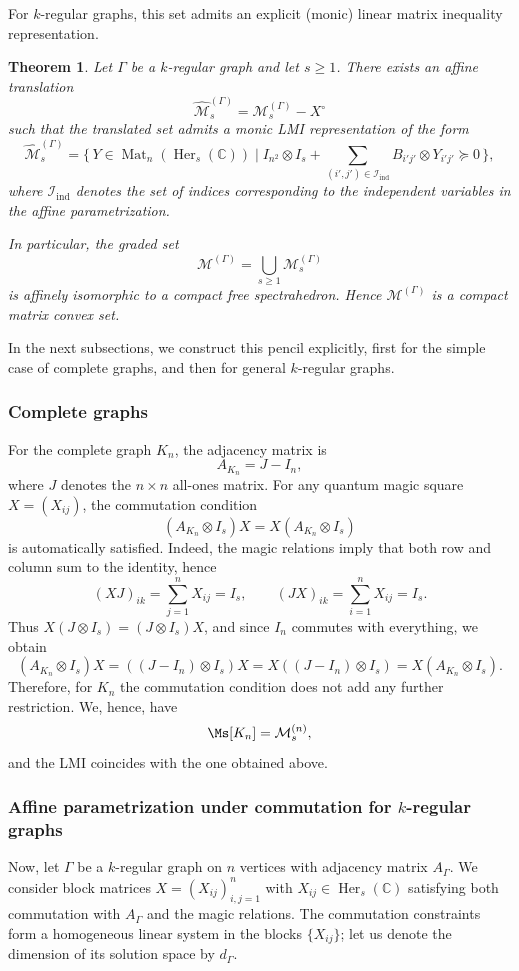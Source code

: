 \documentclass[11pt, a4paper]{article}
\theoremstyle{plain}
\newtheorem{theorem}{Theorem}[section]
\theoremstyle{definition}
\theoremstyle{remark}
\newcommand{\C}{\mathbb{C}}
\newcommand{\cMn}{\mathcal{M}^{(n)}}
\newcommand{\Her}[2][\C]{\operatorname{Her}_{#2}(#1)}
\begin{document}
For \(k\)-regular graphs, this set admits an explicit (monic) linear matrix inequality representation.
\begin{theorem}\label{thm:kregular_GQMS_freespec}
Let \(\Gamma\) be a \(k\)-regular graph and let \(s \ge 1\).
There exists an affine translation
\[
\widehat{\mathcal M}^{(\Gamma)}_s
=
\mathcal M^{(\Gamma)}_s - X^\circ
\]
such that the translated set admits a monic LMI representation of the form
\[
\widehat{\mathcal M}^{(\Gamma)}_s
=
\bigl\{\, Y \in \operatorname{Mat}_n(\Her{s}) \mid
I_{n^2}\otimes I_s
+ \sum_{(i',j')\in \mathcal{I}_{\mathrm{ind}}}
B_{i'j'} \otimes Y_{i'j'}
\succeq 0
\,\bigr\},
\]
where \(\mathcal{I}_{\mathrm{ind}}\) denotes the set of indices corresponding to the
independent variables in the affine parametrization.

In particular, the graded set
\[
\mathcal M^{(\Gamma)} = \bigcup_{s \ge 1} \mathcal M^{(\Gamma)}_s
\]
is affinely isomorphic to a compact free spectrahedron.
Hence \(\mathcal M^{(\Gamma)}\) is a compact matrix convex set.
\end{theorem}


In the next subsections, we construct this pencil explicitly, first for the simple case of complete graphs, and then for general \(k\)-regular graphs.


\subsubsection{Complete graphs}

For the complete graph \(K_n\), the adjacency matrix is
\[
A_{K_n} = J - I_n,
\]
where \(J\) denotes the \(n\times n\) all-ones matrix.
For any quantum magic square \(X=(X_{ij})\), the commutation condition
\[
(A_{K_n}\otimes I_s) X = X (A_{K_n}\otimes I_s)
\]
is automatically satisfied. Indeed, the magic relations imply that both row and column sum to the identity, hence
\[
(XJ)_{ik} = \sum_{j=1}^n X_{ij} = I_s, \qquad
(JX)_{ik} = \sum_{i=1}^n X_{ij} = I_s.
\]
Thus \(X(J\otimes I_s) = (J\otimes I_s)X\), and since \(I_n\) commutes with everything, we obtain
\[
(A_{K_n}\otimes I_s)X = ((J-I_n)\otimes I_s)X = X((J-I_n)\otimes I_s) = X (A_{K_n}\otimes I_s).
\]
Therefore, for \(K_n\) the commutation condition does not add any further restriction. We, hence, have
\[
\Ms[K_n] = \cMn_s,
\]
and the LMI coincides with the one obtained above.
\subsubsection{Affine parametrization under commutation for \(k\)-regular graphs}
Now, let \(\Gamma\) be a \(k\)-regular graph on \(n\) vertices with adjacency matrix \(A_\Gamma\). 
We consider block matrices \(X = (X_{ij})_{i,j=1}^n\) with \(X_{ij} \in \Her{s}\) satisfying both commutation with \(A_\Gamma\) and the magic relations.
The commutation constraints form a homogeneous linear system in the blocks \(\{X_{ij}\}\); let us denote the dimension of its solution space by \(d_\Gamma\).
\end{document}
